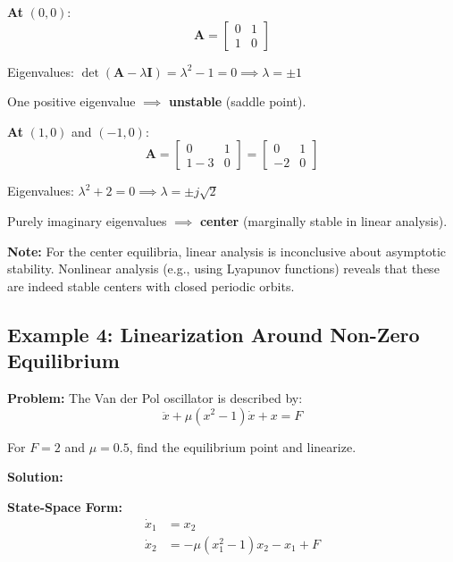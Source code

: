 \textbf{At} $(0, 0)$:
\begin{equation}
\mathbf{A} = \begin{bmatrix} 0 & 1 \\ 1 & 0 \end{bmatrix}
\end{equation}

Eigenvalues: $\det(\mathbf{A} - \lambda\mathbf{I}) = \lambda^2 - 1 = 0 \implies \lambda = \pm 1$

One positive eigenvalue $\implies$ \textbf{unstable} (saddle point).

\textbf{At} $(1, 0)$ and $(-1, 0)$:
\begin{equation}
\mathbf{A} = \begin{bmatrix} 0 & 1 \\ 1 - 3 & 0 \end{bmatrix} = \begin{bmatrix} 0 & 1 \\ -2 & 0 \end{bmatrix}
\end{equation}

Eigenvalues: $\lambda^2 + 2 = 0 \implies \lambda = \pm j\sqrt{2}$

Purely imaginary eigenvalues $\implies$ \textbf{center} (marginally stable in linear analysis).

\textbf{Note:} For the center equilibria, linear analysis is inconclusive about asymptotic stability. Nonlinear analysis (e.g., using Lyapunov functions) reveals that these are indeed stable centers with closed periodic orbits.

\hrulefill

\subsection{Example 4: Linearization Around Non-Zero Equilibrium}

\textbf{Problem:} The Van der Pol oscillator is described by:
\begin{equation}
\ddot{x} + \mu(x^2 - 1)\dot{x} + x = F
\end{equation}

For $F = 2$ and $\mu = 0.5$, find the equilibrium point and linearize.

\textbf{Solution:}

\textbf{State-Space Form:}
\begin{align}
\dot{x}_1 &= x_2 \\
\dot{x}_2 &= -\mu(x_1^2 - 1)x_2 - x_1 + F
\end{align}

